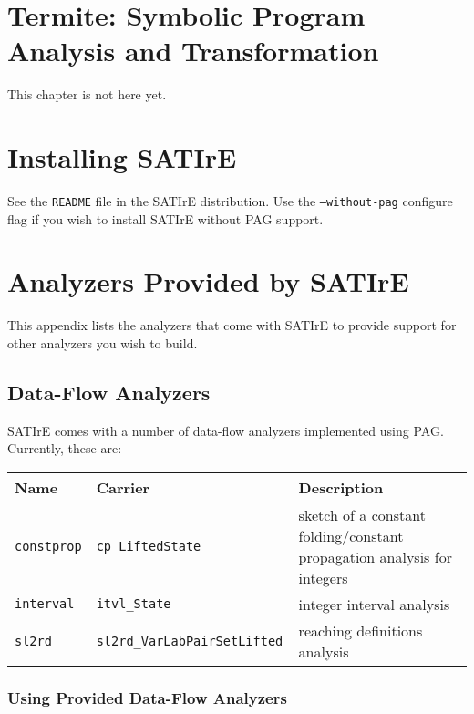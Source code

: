 \documentclass[a4paper,12pt]{report}
\begin{document}
\chapter{Termite: Symbolic Program Analysis and Transformation}
\label{chap:termite}

This chapter is not here yet.

\appendix

\chapter{Installing SATIrE}
\label{appendix:installing}

See the \texttt{README} file in the SATIrE distribution. Use the
\texttt{--without-pag} configure flag if you wish to install SATIrE without
PAG support.

\chapter{Analyzers Provided by SATIrE}
\label{appendix:analyzers}

This appendix lists the analyzers that come with SATIrE to provide support
for other analyzers you wish to build.

\section{Data-Flow Analyzers}
\label{sec:analysis_dataflow}

SATIrE comes with a number of data-flow analyzers implemented using PAG.
Currently, these are:

\begin{center}
\begin{tabular}{l l p{}}
Name & Carrier & Description \\
\hline
\texttt{constprop} & \verb|cp_LiftedState| &
    sketch of a constant folding/constant propagation analysis for
    integers\\
\texttt{interval} & \verb|itvl_State| &
    integer interval analysis\\
\texttt{sl2rd} & \verb|sl2rd_VarLabPairSetLifted | &
    reaching definitions analysis
\end{tabular}
\end{center}

\subsection{Using Provided Data-Flow Analyzers}
\label{sec:analysis_dataflow_use}
\end{document}
